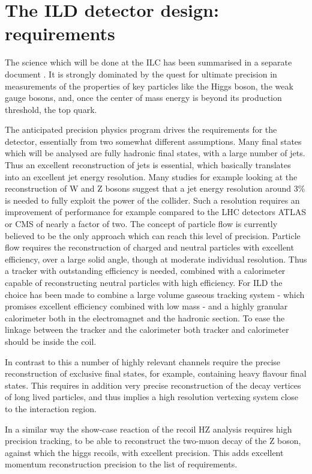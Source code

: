 \documentclass[%
 amsmath,amssymb,
 aps,
]{revtex4-1}
\begin{document}
\section{The ILD detector design: requirements}
The science which will be done at the ILC has been summarised in a separate document \cite{ILC-ESU1}. It is strongly dominated by the quest for ultimate precision in measurements of the properties of key particles like the Higgs boson, the weak gauge bosons, and, once the center of mass energy is beyond its production threshold, the top quark. 

The anticipated precision physics program drives the requirements for the detector, essentially from two somewhat different assumptions. Many final states which will be analysed are fully hadronic final states, with a large number of jets. Thus an excellent reconstruction of jets is essential, which basically translates into an excellent jet energy resolution. Many studies for example looking at the reconstruction of W and Z bosons suggest that a jet energy resolution around 3\% is needed to fully exploit the power of the collider. Such a resolution requires an improvement of performance for example compared to the LHC detectors ATLAS or CMS of nearly a factor of two. The concept of particle flow is currently believed to be the only approach which can reach this level of precision. Particle flow requires the reconstruction of charged and neutral particles with excellent efficiency, over a large solid angle, though at moderate individual resolution. Thus a tracker with outstanding efficiency is needed, combined with a calorimeter capable of reconstructing neutral particles with high efficiency. For ILD the choice has been made to combine a large volume gaseous tracking system - which promises excellent efficiency combined with low mass - and a highly granular calorimeter both in the electromagnet and the hadronic section. To ease the linkage between the tracker and the calorimeter both tracker and calorimeter should be inside the coil. 

In contrast to this a number of highly relevant channels require the precise reconstruction of exclusive final states, for example, containing heavy flavour final states. This requires in addition very precise reconstruction of the decay vertices of long lived particles, and thus implies a high resolution vertexing system close to the interaction region. 

In a similar way the show-case reaction of the recoil HZ analysis requires high precision tracking, to be able to reconstruct the two-muon decay of the Z boson, against which the higgs recoils, with excellent precision. This adds excellent momentum reconstruction precision to the list of requirements. 
\end{document}
